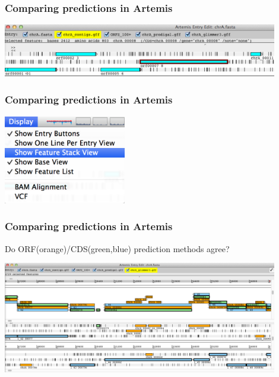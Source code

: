 \documentclass[table]{beamer}
\begin{document}
    \begin{frame}
     \frametitle{Comparing predictions in Artemis}
      \begin{center}
        \includegraphics[width=0.9\textwidth]{images/artemis_cdspred1}     
      \end{center}
    \end{frame}

    \begin{frame}
     \frametitle{Comparing predictions in Artemis}
      \begin{center}
        \includegraphics[width=0.4\textwidth]{images/artemis_cdspred2}     
      \end{center}
    \end{frame}

    \begin{frame}
     \frametitle{Comparing predictions in Artemis}
     Do ORF(orange)/CDS(green,blue) prediction methods agree?
      \begin{center}
        \includegraphics[width=0.9\textwidth]{images/artemis_cdspred3}     
      \end{center}
    \end{frame}
\end{document}
